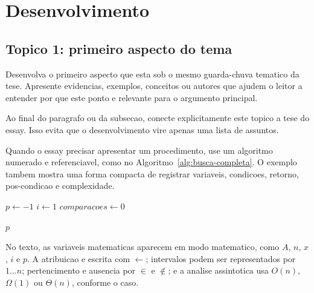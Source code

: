 \section{Desenvolvimento}

\subsection{Topico 1: primeiro aspecto do tema}


Desenvolva o primeiro aspecto que esta sob o mesmo guarda-chuva tematico da
tese. Apresente evidencias, exemplos, conceitos ou autores que ajudem o leitor
a entender por que este ponto e relevante para o argumento principal.

Ao final do paragrafo ou da subsecao, conecte explicitamente este topico a tese
do essay. Isso evita que o desenvolvimento vire apenas uma lista de assuntos.

Quando o essay precisar apresentar um procedimento, use um algoritmo numerado e
referenciavel, como no Algoritmo~\ref{alg:busca-completa}. O exemplo tambem
mostra uma forma compacta de registrar variaveis, condicoes, retorno,
pos-condicao e complexidade.

\begin{algorithm}[H]
\caption{Busca linear com sentinela de controle}
\label{alg:busca-completa}

$p \gets -1$
$i \gets 1$
$comparacoes \gets 0$


\Retorne $p$\;
\end{algorithm}

No texto, as variaveis matematicas aparecem em modo matematico, como $A$, $n$,
$x$, $i$ e $p$. A atribuicao e escrita com $\gets$; intervalos podem ser
representados por $1 \ldots n$; pertencimento e ausencia por $\in$ e $\notin$;
e a analise assintotica usa $O(n)$, $\Omega(1)$ ou $\Theta(n)$, conforme o caso.
